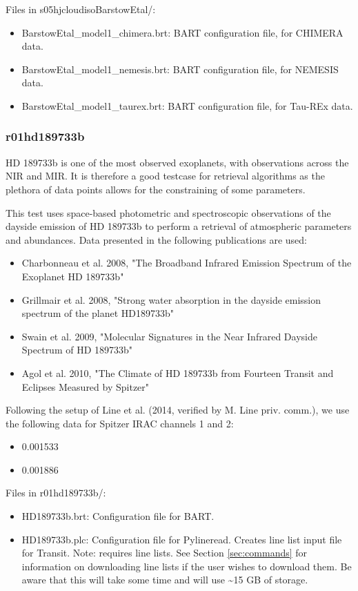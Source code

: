 \documentclass[letterpaper, 12pt]{article}
\begin{document}
Files in s05hjcloudisoBarstowEtal/:
\begin{itemize} \itemsep0pt
  \item BarstowEtal{\_}model1{\_}chimera.brt: BART configuration file, for CHIMERA data.
  \item BarstowEtal{\_}model1{\_}nemesis.brt: BART configuration file, for NEMESIS data.
  \item BarstowEtal{\_}model1{\_}taurex.brt:  BART configuration file, for Tau-REx data.
\end{itemize}

\subsubsection{r01hd189733b}
HD 189733b is one of the most observed exoplanets, with observations across the NIR and MIR. 
It is therefore a good testcase for retrieval algorithms as the plethora of 
data points allows for the constraining of some parameters. 

This test uses space-based photometric and spectroscopic observations of the 
dayside emission of HD 189733b to perform a retrieval of atmospheric parameters 
and abundances. Data presented in the following publications are used:
\begin{itemize} \itemsep0pt
  \item Charbonneau et al. 2008, "The Broadband Infrared Emission Spectrum of the Exoplanet HD 189733b"
  \item Grillmair et al. 2008, "Strong water absorption in the dayside emission spectrum of the planet HD189733b"
  \item Swain et al. 2009, "Molecular Signatures in the Near Infrared Dayside Spectrum of HD 189733b"
  \item Agol et al. 2010, "The Climate of HD 189733b from Fourteen Transit and Eclipses Measured by Spitzer"
\end{itemize}

Following the setup of Line et al. (2014, verified by M. Line priv. comm.), 
we use the following data for Spitzer IRAC channels 1 and 2:
\begin{itemize} \itemsep0pt
  \item 0.001533 
  \item 0.001886 
\end{itemize}

Files in r01hd189733b/:
\begin{itemize} \itemsep0pt
  \item HD189733b.brt: Configuration file for BART.
  \item HD189733b.plc: Configuration file for Pylineread. Creates 
        line list input file for Transit. Note: requires line lists. See 
        Section \ref{sec:commands} for information on downloading line lists if 
        the user wishes to download them. Be aware that this will take some 
        time and will use {\sim}15 GB of storage.
\end{itemize}
\end{document}
